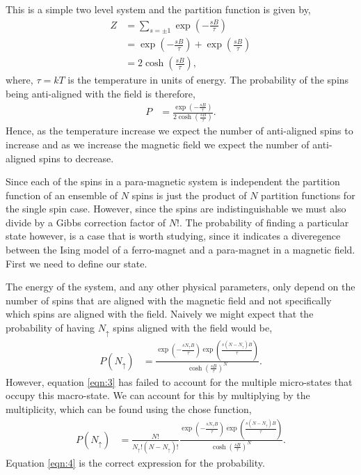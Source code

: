 \documentclass[a4paper, twocolumn]{article}
\begin{document}
This is a simple two level system and the partition function %
is given by, 
%
\begin{align}
Z &= \sum_{s = \pm 1}\exp\left(-\frac{sB}{\tau}\right)\nonumber\\
    &= \exp\left(-\frac{sB}{\tau}\right) + 
        \exp\left(\frac{sB}{\tau}\right)\nonumber\\
    &= 2\cosh\left(\frac{sB}{\tau}\right),
\label{eqn:1}
\end{align}
%
where, \(\tau = kT\) is the temperature in units of energy. %
The probability of the spins being anti-aligned with the %
field is therefore, 
%
\begin{align}
P &= \frac{\exp\left(-\frac{sB}{\tau}\right)}
        {2\cosh\left(\frac{sB}{\tau}\right)}.
\label{eqn:2}
\end{align}
%
Hence, as the temperature increase we expect the number of %
anti-aligned spins to increase and as we increase the %
magnetic field we expect the number of anti-aligned spins %
to decrease. 


Since each of the spins in a para-magnetic system is independent %
the partition function of an ensemble of \(N\) spins is just %
the product of \(N\) partition functions for the single spin %
case. However, since the spins are indistinguishable we must %
also divide by a Gibbs correction factor of \(N!\). %
The probability of finding a particular state however, %
is a case that is worth studying, since it indicates a %
diveregence between the Ising model of a ferro-magnet and %
a para-magnet in a magnetic field. First we need to define %
our state. 


The energy of the system, and any other physical %
parameters, only depend on the number of spins that are %
aligned with the magnetic field and not specifically %
which spins are aligned with the field. Naively we might %
expect that the probability of having \(N_{\uparrow}\) %
spins aligned with the field would be,
%
\begin{align}
P(N_{\uparrow}) &= \frac{
        \exp\left(-\frac{sN_{\uparrow}B}{\tau}\right)
        \exp\left(\frac{s(N - N_{\uparrow})B}{\tau}\right)}{
        \cosh\left(\frac{sB}{\tau}\right)^{N}}.
\label{eqn:3}
\end{align}
%
However, equation \ref{eqn:3} has failed to account for the %
multiple micro-states that occupy this macro-state. We can %
account for this by multiplying by the multiplicity, which %
can be found using the chose function,
%
\begin{align}
P(N_{\uparrow}) &= \frac{N!}{N_{\uparrow}!(N - N_{\uparrow})!}
        \frac{\exp\left(-\frac{sN_{\uparrow}B}{\tau}\right)
        \exp\left(\frac{s(N - N_{\uparrow})B}{\tau}\right)}{
        \cosh\left(\frac{sB}{\tau}\right)^{N}}.
\label{eqn:4}
\end{align}
%
Equation \ref{eqn:4} is the correct expression for the probability.
\end{document}
